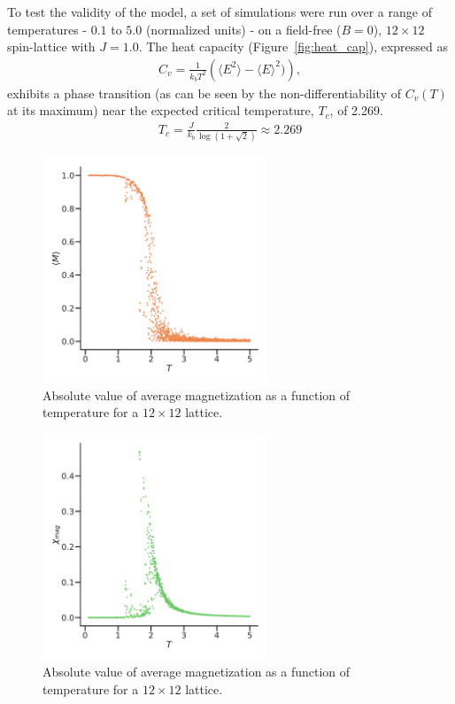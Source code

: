 \documentclass[11pt]{article}
\begin{document}
    To test the validity of the model, a set of simulations were run over a range of temperatures
    - $0.1$ to $5.0$ (normalized units) - on a field-free ($B = 0$), $12 \times 12$ spin-lattice with $J = 1.0$.
    The heat capacity (Figure~\ref{fig:heat_cap}),
    expressed as
    \begin{align*}
        C_v = \frac{1}{k_b T^2}\left(\langle E^2 \rangle - \langle E \rangle^2)\right),
    \end{align*} exhibits a phase transition (as can be seen by the non-differentiability of $C_v(T)$ at its maximum) near the expected critical temperature, $T_c$, of 2.269.
    \begin{align*}
        T_c = \frac{J}{k_b} \frac{2}{\log{(1 + \sqrt {2})}} \approx 2.269
    \end{align*}

    \begin{figure}
        \centering
        \includegraphics[width=0.6\textwidth]{../Python/mag.pdf}

        \caption{Absolute value of average magnetization as a function of temperature for a $12 \times 12$ lattice.}
        \label{fig:mag}
    \end{figure}

    \begin{figure}
        \centering
        \includegraphics[width=0.6\textwidth]{../Python/mag_sus.pdf}

        \caption{Absolute value of average magnetization as a function of temperature for a $12 \times 12$ lattice.}
        \label{fig:mag_sus}
    \end{figure}
\end{document}
